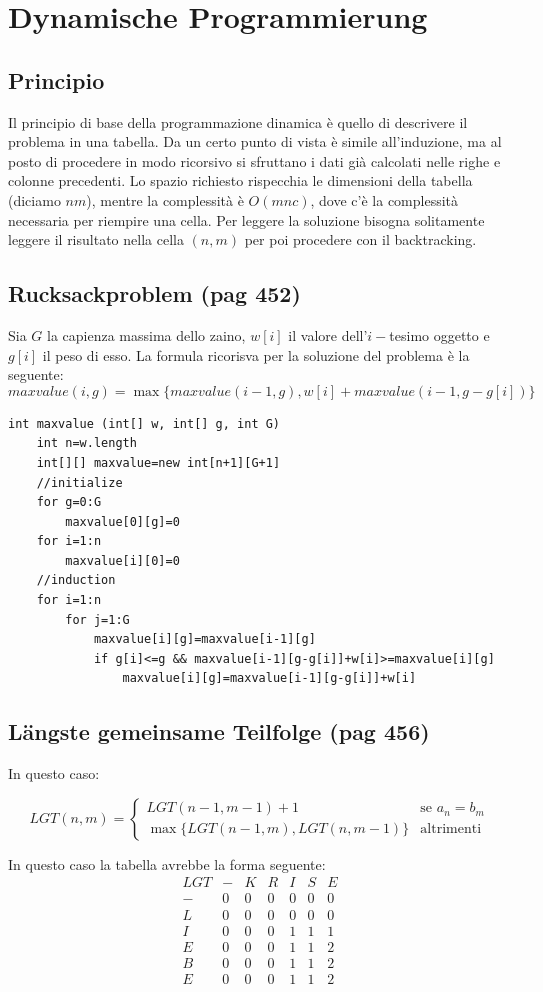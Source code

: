 \documentclass[a4paper]{book}
\newcommand{\lstIndent}{4}
\begin{document}
\section{Dynamische Programmierung}
\subsection{Principio}
Il principio di base della programmazione dinamica è quello di descrivere il problema in una tabella. Da un certo punto di vista è simile all'induzione, ma al posto di procedere in modo ricorsivo si sfruttano i dati già calcolati nelle righe e colonne precedenti. Lo spazio richiesto rispecchia le dimensioni della tabella (diciamo $nm$), mentre la complessità è $O(mnc)$, dove c'è la complessità necessaria per riempire una cella. Per leggere la soluzione bisogna solitamente leggere il risultato nella cella $(n,m)$ per poi procedere con il backtracking.
\subsection{Rucksackproblem (pag 452)}
Sia $G$ la capienza massima dello zaino, $w[i]$ il valore dell'$i-$tesimo oggetto e $g[i]$ il peso di esso. La formula ricorisva per la soluzione del problema è la seguente:
$$maxvalue(i,g)=\max \{maxvalue(i-1,g),w[i]+maxvalue(i-1,g-g[i])\}$$
\begin{lstlisting}[tabsize=\lstIndent]
int maxvalue (int[] w, int[] g, int G)
	int n=w.length
	int[][] maxvalue=new int[n+1][G+1]
	//initialize
	for g=0:G
		maxvalue[0][g]=0
	for i=1:n
		maxvalue[i][0]=0
	//induction
	for i=1:n	
		for j=1:G
			maxvalue[i][g]=maxvalue[i-1][g]
			if g[i]<=g && maxvalue[i-1][g-g[i]]+w[i]>=maxvalue[i][g]
				maxvalue[i][g]=maxvalue[i-1][g-g[i]]+w[i]
\end{lstlisting}
\subsection{Längste gemeinsame Teilfolge (pag 456)}
In questo caso:

\[
LGT(n,m) =\begin{cases}
LGT(n-1,m-1)+1 & \mbox{se } a_n=b_m \\
\max\{LGT(n-1,m),LGT(n,m-1)\} & \mbox{altrimenti}
\end{cases}
\]

In questo caso la tabella avrebbe la forma seguente:
$$\begin{array}{ccccccc}
LGT & - & K & R & I & S & E \\ 
- & 0 & 0 & 0 & 0 & 0 & 0 \\ 
L & 0 & 0 & 0 & 0 & 0 & 0 \\ 
I & 0 & 0 & 0 & 1 & 1 & 1 \\ 
E & 0 & 0 & 0 & 1 & 1 & 2 \\ 
B & 0 & 0 & 0 & 1 & 1 & 2 \\ 
E & 0 & 0 & 0 & 1 & 1 & 2
\end{array} $$
\end{document}
